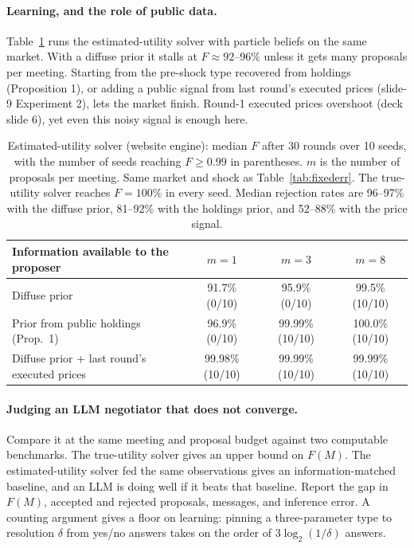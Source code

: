 \paragraph{Learning, and the role of public data.}
Table~\ref{tab:estsolver} runs the estimated-utility solver with particle beliefs on the same market. With a diffuse prior it stalls at $F\approx92$--$96\%$ unless it gets many proposals per meeting. Starting from the pre-shock type recovered from holdings (Proposition 1), or adding a public signal from last round's executed prices (slide-9 Experiment 2), lets the market finish. Round-1 executed prices overshoot (deck slide 6), yet even this noisy signal is enough here.

\begin{table}[h]
\centering\small
\begin{tabular}{lccc}
\hline
Information available to the proposer & $m=1$ & $m=3$ & $m=8$ \\
\hline
Diffuse prior                                & 91.7\% (0/10) & 95.9\% (0/10) & 99.5\% (10/10) \\
Prior from public holdings (Prop.~1)         & 96.9\% (0/10) & 99.99\% (10/10) & 100.0\% (10/10) \\
Diffuse prior + last round's executed prices & 99.98\% (10/10) & 99.99\% (10/10) & 99.99\% (10/10) \\
\hline
\end{tabular}
\caption{Estimated-utility solver (website engine): median $F$ after 30 rounds over 10 seeds, with the number of seeds reaching $F\ge 0.99$ in parentheses. $m$ is the number of proposals per meeting. Same market and shock as Table~\ref{tab:fixederr}. The true-utility solver reaches $F=100\%$ in every seed. Median rejection rates are 96--97\% with the diffuse prior, 81--92\% with the holdings prior, and 52--88\% with the price signal.}
\label{tab:estsolver}
\end{table}

\paragraph{Judging an LLM negotiator that does not converge.}
Compare it at the same meeting and proposal budget against two computable benchmarks. The true-utility solver gives an upper bound on $F(M)$. The estimated-utility solver fed the same observations gives an information-matched baseline, and an LLM is doing well if it beats that baseline. Report the gap in $F(M)$, accepted and rejected proposals, messages, and inference error. A counting argument gives a floor on learning: pinning a three-parameter type to resolution $\delta$ from yes/no answers takes on the order of $3\log_2(1/\delta)$ answers.

